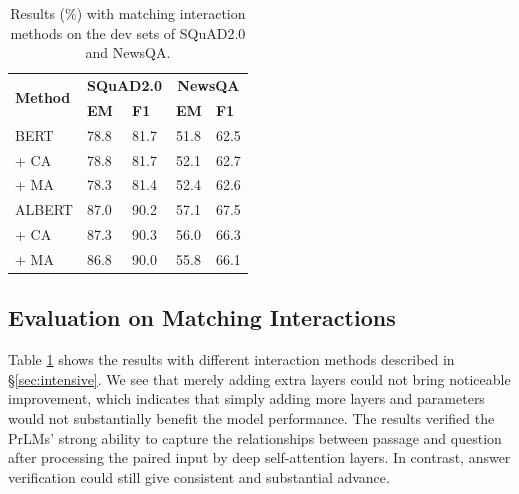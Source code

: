 \documentclass[letterpaper]{article} %
\begin{document}
\begin{table}
	\begin{center}
		\setlength{\tabcolsep}{10pt}
		{
			\begin{tabular}{lllll}
				\toprule
				\multirow{2}{*}{\textbf{Method}} & \multicolumn{2}{c}{\textbf{SQuAD2.0}} & \multicolumn{2}{c}{\textbf{NewsQA}} \\
				& \textbf{EM} & \textbf{F1} & \textbf{EM} & \textbf{F1} \\
				\midrule
				BERT &  78.8 & 81.7 & 51.8 & 62.5 \\
				\quad     + CA &  78.8 & 81.7 & 52.1 & 62.7\\
				\quad     + MA  &  78.3  & 81.4  & 52.4 & 62.6 \\
				\midrule 
				ALBERT & 87.0 & 90.2 & 57.1 & 67.5\\
				\quad     + CA & 87.3 & 90.3  & 56.0 & 66.3  \\
				\quad     + MA  & 86.8 & 90.0  & 55.8 & 66.1  \\
				\bottomrule
			\end{tabular}
		}
	\end{center}
	\caption{\label{tableatt} Results (\%) with matching interaction methods on the dev sets of SQuAD2.0 and NewsQA.}
\end{table}
\subsection{Evaluation on Matching Interactions}
Table \ref{tableatt} shows the results with different interaction methods described in \S\ref{sec:intensive}. 
We see that merely adding extra layers could not bring noticeable improvement, which indicates that simply adding more layers and parameters would not substantially benefit the model performance. The results verified the PrLMs' strong ability to capture the relationships between passage and question after processing the paired input by deep self-attention layers. In contrast, answer verification could still give consistent and substantial advance.
\end{document}
